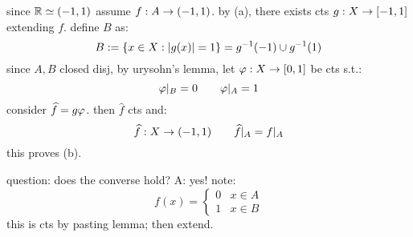 since $\mathbb{R}\simeq(-1,1)$ assume $f:A\rightarrow(-1,1)$.
by (a), there exists cts $g:X\rightarrow[-1,1]$ extending $f$.
define $B$ as:
\begin{equation*}
    B:=\left\{{x\in X:\abs{g(x)}=1}\right\} = g^{-1}(-1)\cup g^{-1}(1)
\end{equation*}
since $A,B$ closed disj, by urysohn's lemma, let $\varphi:X\rightarrow[0,1]$ be cts s.t.:
\begin{equation*}
    \varphi\rvert_{B}=0 \qquad \varphi\rvert_{A}=1
\end{equation*}
consider $\widehat{f}=g\varphi$.
then $\hat{f}$ cts and:
\begin{equation*}
    \widehat{f}:X\rightarrow(-1,1) \qquad \widehat{f}\rvert_{A}=f\rvert_{A}
\end{equation*}
this proves (b).

question: does the converse hold? A: yes! note:
\begin{equation*}
    f(x)=
    \begin{cases}
        0 & x\in A \\ 1 & x\in B
    \end{cases}
\end{equation*}
this is cts by pasting lemma; then extend.



